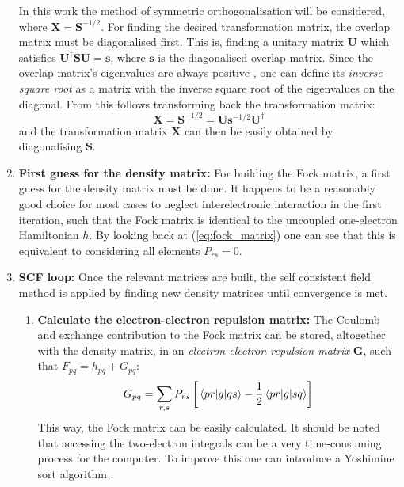 \begin{enumerate}
    \begin{tcolorbox}[colback=blue!5!white,colframe=blue!1!white]
        In this work the method of symmetric orthogonalisation will be considered, where $\mathbf{X}=\mathbf{S}^{-1/2}$. For finding the desired transformation matrix, the overlap matrix must be diagonalised first. This is, finding a unitary matrix $\mathbf{U}$ which satisfies $\mathbf{U}^\dagger\mathbf{S}\mathbf{U} = \mathbf{s}$, where $\mathbf{s}$ is the diagonalised overlap matrix. Since the overlap matrix's eigenvalues are always positive \cite{computationalphysics}, one can define its \emph{inverse square root} as a matrix with the inverse square root of the eigenvalues on the diagonal. From this follows transforming back the transformation matrix:
        \begin{equation}
            \mathbf{X} = \mathbf{S}^{-1/2} = \mathbf{U} \mathbf{s}^{-1/2} \mathbf{U}^\dagger
        \end{equation}
        and the transformation matrix $\mathbf{X}$ can then be easily obtained by diagonalising $\mathbf{S}$.
    \end{tcolorbox}
    \item \textbf{First guess for the density matrix:} For building the Fock matrix, a first guess for the density matrix must be done. It happens to be a reasonably good choice for most cases to neglect interelectronic interaction in the first iteration, such that the Fock matrix is identical to the uncoupled one-electron Hamiltonian $h$. By looking back at (\ref{eq:fock_matrix}) one can see that this is equivalent to considering all elements $P_{rs}=0$.
    \item \textbf{SCF loop:} Once the relevant matrices are built, the self consistent field method is applied by finding new density matrices until convergence is met.
    \begin{enumerate}
        \item \textbf{Calculate the electron-electron repulsion matrix:} The Coulomb and exchange contribution to the Fock matrix can be stored, altogether with the density matrix, in an \emph{electron-electron repulsion matrix} $\mathbf{G}$, such that $F_{pq}=h_{pq}+G_{pq}$:
    \begin{equation}
        G_{pq} = \sum_{r,s}P_{rs}\left[\mel{pr}{g}{qs}-\frac{1}{2}\mel{pr}{g}{sq}\right]
        \label{eq:two_electron_matrix}
    \end{equation}
    This way, the Fock matrix can be easily calculated. It should be noted that accessing the two-electron integrals can be a very time-consuming process for the computer. To improve this one can introduce a Yoshimine sort algorithm \cite{yoshimine}.%

\end{enumerate}
\end{enumerate}
